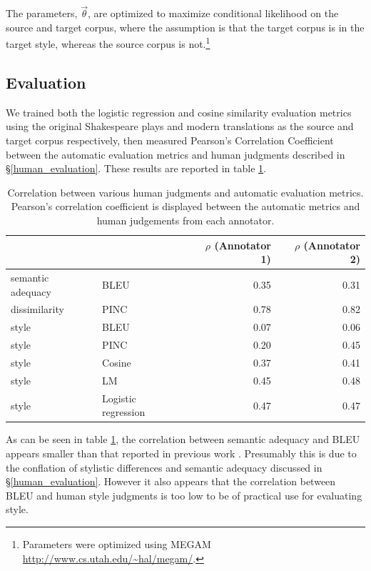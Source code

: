 \documentclass[10pt,a5paper,twoside]{article}
\begin{document}
The parameters, $\vec{\theta}$, are optimized to maximize conditional likelihood on the source and target corpus, where the assumption is that the target corpus
is in the target style, whereas the source corpus is not.\footnote{
  Parameters were optimized using MEGAM \url{http://www.cs.utah.edu/~hal/megam/}.
}

\subsection{Evaluation}
We trained both the logistic regression and cosine similarity evaluation metrics using the original Shakespeare plays and modern translations as
the source and target corpus respectively, then measured Pearson's Correlation Coefficient between the automatic
evaluation metrics and human judgments described in \S \ref{human_evaluation}.  These results are reported in table \ref{correlation}.

\begin{table}
  \begin{center}
  \begin{tabular}{|l|l|r|r|}
    \hline
    & & $\rho$ (Annotator 1) & $\rho$ (Annotator 2) \\
    \hline
    \hline
    semantic adequacy & BLEU & 0.35 & 0.31 \\
    \hline
    dissimilarity & PINC & 0.78 & 0.82 \\
    \hline
    style & BLEU & 0.07 & 0.06 \\
    \hline
    style & PINC & 0.20 & 0.45 \\
    \hline
    style & Cosine & 0.37 & 0.41 \\
    \hline
    style & LM & 0.45 & 0.48 \\
    \hline
    style & Logistic regression & 0.47 & 0.47 \\
    \hline
  \end{tabular}
  \end{center}
  \caption{Correlation between various human judgments and automatic evaluation metrics.  Pearson's correlation coefficient is displayed
  between the automatic metrics and human judgements from each annotator.}
  \label{correlation}
\end{table}

As can be seen in table \ref{correlation}, the correlation between semantic adequacy and BLEU appears smaller than that reported in previous work \cite{chen11}.  Presumably this is
due to the conflation of stylistic differences and semantic adequacy discussed in \S \ref{human_evaluation}.  However it also appears 
that the correlation between BLEU and human style judgments is too low to be of practical use for evaluating style.
\end{document}
